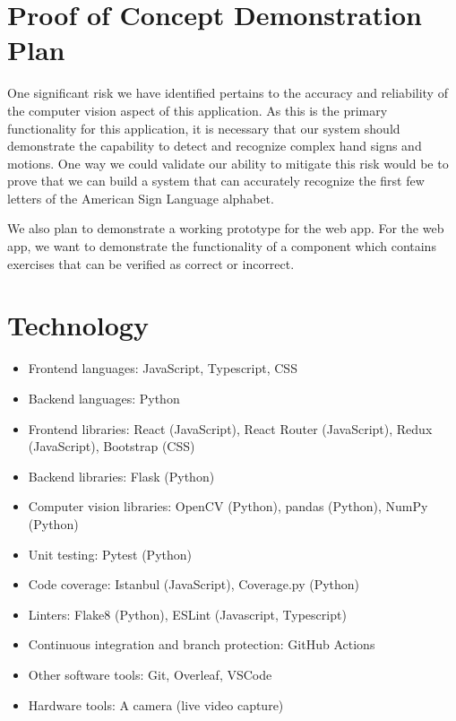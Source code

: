 \documentclass{article}
\begin{document}
\section{Proof of Concept Demonstration Plan}

One significant risk we have identified pertains to the accuracy and reliability of the computer vision aspect of this application. As this is the primary functionality for this application, it is necessary that our system should demonstrate the capability to detect and recognize complex hand signs and motions. One way we could validate our ability to mitigate this risk would be to prove that we can build a system that can accurately recognize the first few letters of the American Sign Language alphabet.


We also plan to demonstrate a working prototype for the web app. For the web app, we want to demonstrate the functionality of a component which contains exercises that can be verified as correct or incorrect. 

\section{Technology}

\begin{itemize}
\item Frontend languages: JavaScript, Typescript, CSS
\item Backend languages: Python
\item Frontend libraries: React (JavaScript), React Router (JavaScript), Redux (JavaScript), Bootstrap (CSS)
\item Backend libraries: Flask (Python)
\item Computer vision libraries: OpenCV (Python), pandas (Python), NumPy (Python)
\item Unit testing: Pytest (Python)
\item Code coverage: Istanbul (JavaScript), Coverage.py (Python)
\item Linters: Flake8 (Python), ESLint (Javascript, Typescript)
\item Continuous integration and branch protection: GitHub Actions
\item Other software tools: Git, Overleaf, VSCode
\item Hardware tools: A camera (live video capture)
\end{itemize}
\end{document}
